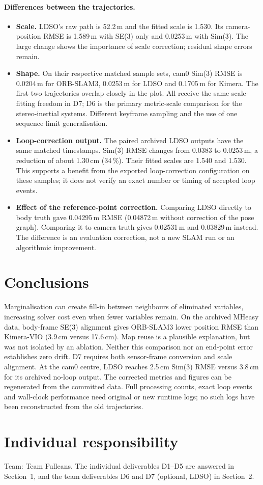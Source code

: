 \documentclass[11pt,a4paper]{article}
\DeclareRobustCommand{\code}[1]{\begingroup\ttfamily\codebreaks#1\endgroup}
\newcommand{\codebreaks}{\renewcommand{\_}{\textunderscore\allowbreak}}
\begin{document}
\paragraph{Differences between the trajectories.}
\begin{itemize}
\item \textbf{Scale.} LDSO's raw path is 52.2\,m and the fitted scale is 1.530.
  Its camera-position RMSE is 1.589\,m with SE(3) only and 0.0253\,m with Sim(3).
  The large change shows the importance of scale correction; residual shape errors remain.
\item \textbf{Shape.} On their respective matched sample sets, cam0 Sim(3) RMSE is
  0.0204\,m for ORB-SLAM3, 0.0253\,m for LDSO and 0.1705\,m for Kimera. The first two
  trajectories overlap closely in the plot. All receive the same scale-fitting freedom
  in D7; D6 is the primary metric-scale comparison for the stereo-inertial systems.
  Different keyframe sampling and the use of one sequence limit generalisation.
\item \textbf{Loop-correction output.} The paired archived LDSO outputs have the same
  matched timestamps. Sim(3) RMSE changes from 0.0383 to 0.0253\,m, a reduction of
  about 1.30\,cm (34\,\%). Their fitted scales are 1.540 and 1.530. This supports a benefit
  from the exported loop-correction configuration on these samples; it does not verify
  an exact number or timing of accepted loop events.
\item \textbf{Effect of the reference-point correction.} Comparing LDSO directly to body
  truth gave 0.04295\,m RMSE (0.04872\,m without correction of the pose graph). Comparing
  it to camera truth gives 0.02531\,m and 0.03829\,m instead. The difference is an
  evaluation correction, not a new SLAM run or an algorithmic improvement.
\end{itemize}

\section{Conclusions}
Marginalisation can create fill-in between neighbours of eliminated variables, increasing
solver cost even when fewer variables remain. On the archived \code{MH\_01\_easy} data,
body-frame SE(3) alignment gives ORB-SLAM3 lower position RMSE than Kimera-VIO
(3.9\,cm versus 17.6\,cm). Map reuse is a plausible explanation, but was not isolated by
an ablation. Neither this comparison nor an end-point error establishes zero drift.
D7 requires both sensor-frame conversion and scale alignment. At the cam0 centre, LDSO
reaches 2.5\,cm Sim(3) RMSE versus 3.8\,cm for its archived no-loop output.
The corrected metrics and figures can be regenerated from the committed data. Full
processing counts, exact loop events and wall-clock performance need original or new
runtime logs; no such logs have been reconstructed from the old trajectories.

\section*{Individual responsibility}
Team: Team Fullcans. The individual deliverables D1--D5 are answered in
Section~1, and the team deliverables D6 and D7 (optional, LDSO) in Section~2.



\end{document}
